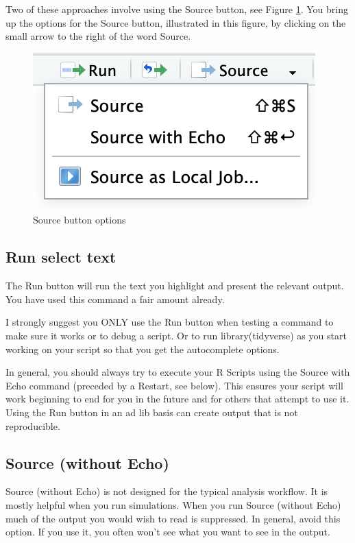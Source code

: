 \documentclass[
]{krantz}
\begin{document}
Two of these approaches involve using the Source button, see Figure \ref{fig:sourcebutton}. You bring up the options for the Source button, illustrated in this figure, by clicking on the small arrow to the right of the word Source.

\begin{figure}
\includegraphics[width=0.35\linewidth]{ch_introduction/images/screenshot_source} \caption{Source button options}\label{fig:sourcebutton}
\end{figure}

\hypertarget{run-select-text}{%
\subsection{Run select text}\label{run-select-text}}

The Run button will run the text you highlight and present the relevant output. You have used this command a fair amount already.

I strongly suggest you ONLY use the Run button when testing a command to make sure it works or to debug a script. Or to run library(tidyverse) as you start working on your script so that you get the autocomplete options.

In general, you should always try to execute your R Scripts using the Source with Echo command (preceded by a Restart, see below). This ensures your script will work beginning to end for you in the future and for others that attempt to use it. Using the Run button in an ad lib basis can create output that is not reproducible.

\hypertarget{source-without-echo}{%
\subsection{Source (without Echo)}\label{source-without-echo}}

Source (without Echo) is not designed for the typical analysis workflow. It is mostly helpful when you run simulations. When you run Source (without Echo) much of the output you would wish to read is suppressed. In general, avoid this option. If you use it, you often won't see what you want to see in the output.
\end{document}
